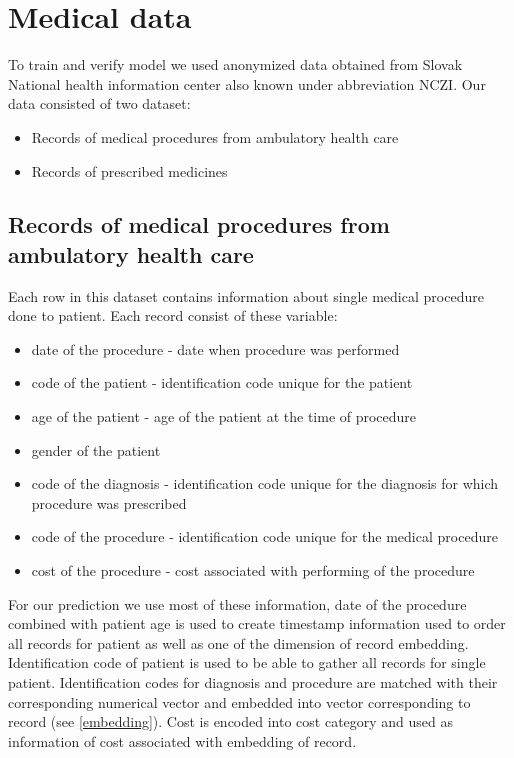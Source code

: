 
\chapter{Medical data} \label{chap:data}

To train and verify model we used anonymized data obtained from Slovak National health information center also known under abbreviation NCZI. Our data consisted of two dataset:
\begin{itemize}
	\item Records of medical procedures from ambulatory health care
	\item Records of prescribed medicines
\end{itemize}

\section{Records of medical procedures from ambulatory health care}

Each row in this dataset contains information about single medical procedure done to patient. Each record consist of these variable:
\begin{itemize}
	\item date of the procedure - date when procedure was performed
	\item code of the patient - identification code unique for the patient
	\item age of the patient - age of the patient at the time of procedure
	\item gender of the patient
	\item code of the diagnosis - identification code unique for the diagnosis for which procedure was prescribed
	\item code of the procedure - identification code unique for the medical procedure 
	\item cost of the procedure - cost associated with performing of the procedure
\end{itemize}

For our prediction we use most of these information, date of the procedure combined with patient age is used to create timestamp information used to order all records for patient as well as one of the dimension of record embedding. Identification code of patient is used to be able to gather all records for single patient. Identification codes for diagnosis and procedure are matched with their corresponding numerical vector and embedded into vector corresponding to record (see \ref{embedding}). Cost is encoded into cost category and used as information of cost associated with embedding of record.

